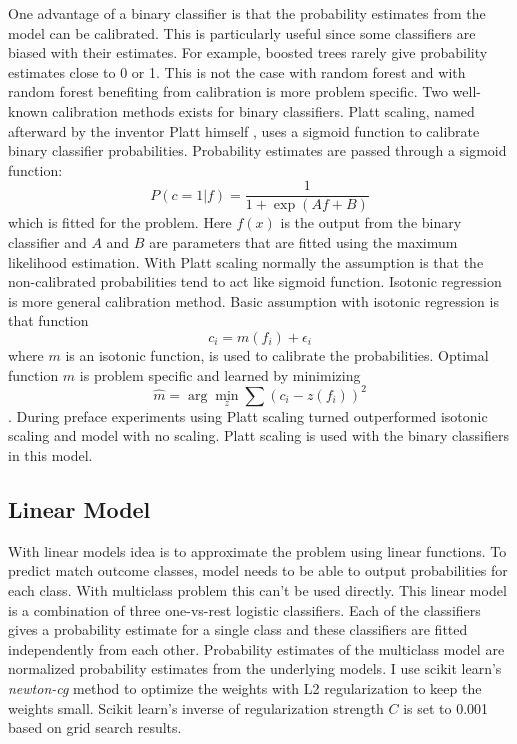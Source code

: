 One advantage of a binary classifier is that the probability estimates from the model can be calibrated. This is particularly useful since some classifiers are biased with their estimates. For example, boosted trees rarely give probability estimates close to 0 or 1. This is not the case with random forest and with random forest benefiting from calibration is more problem specific. \cite{niculescu2005predicting} Two well-known calibration methods exists for binary classifiers. Platt scaling, named afterward by the inventor Platt himself \cite{platt1999probabilistic}, uses a sigmoid function to calibrate binary classifier probabilities. Probability estimates are passed through a sigmoid function:
\begin{equation}
P ( c = 1 | f ) = \frac { 1 } { 1 + \exp ( A f + B ) }
\end{equation}
which is fitted for the problem. Here $f(x)$ is the output from the binary classifier and $A$ and $B$ are parameters that are fitted using the maximum likelihood estimation. With Platt scaling normally the assumption is that the non-calibrated probabilities tend to act like sigmoid function. Isotonic regression is more general calibration method. Basic assumption with isotonic regression is that function
\begin{equation}
c _ { i } = m \left( f _ { i } \right) + \epsilon _ { i }
\end{equation}
where $m$ is an isotonic function, is used to calibrate the probabilities. Optimal function $m$ is problem specific and learned by minimizing
\begin{equation}
\hat { m } = \arg \min _ { z } \sum \left( c _ { i } - z \left( f _ { i } \right) \right) ^ { 2 }
\end{equation}
. \cite{zadrozny2002transforming} During preface experiments using Platt scaling turned outperformed isotonic scaling and model with no scaling. Platt scaling is used with the binary classifiers in this model.

\subsection{Linear Model}
With linear models idea is to approximate the problem using linear functions. To predict match outcome classes, model needs to be able to output probabilities for each class.  With multiclass problem this can't be used directly. This linear model is a combination of three one-vs-rest logistic classifiers. Each of the classifiers gives a probability estimate for a single class and these classifiers are fitted independently from each other. Probability estimates of the multiclass model are normalized probability estimates from the underlying models. I use scikit learn's \textit{newton-cg} method \cite{scipy} to optimize the weights with L2 regularization to keep the weights small. Scikit learn's inverse of regularization strength $C$ is set to 0.001 based on grid search results.

